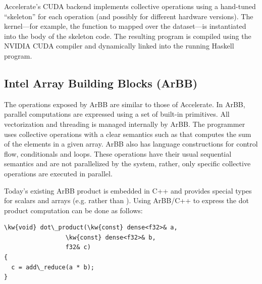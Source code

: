 
Accelerate's CUDA backend implements collective operations using
a hand-tuned ``skeleton'' for each operation (and possibly for
different hardware versions). The kernel---for example, the function
to mapped over the dataset---is 
instantiated into the body of the skeleton code. The resulting 
program is compiled using the NVIDIA CUDA compiler and dynamically linked 
into the running Haskell program.

\subsection{Intel Array Building Blocks (ArBB)}
\label{sec:arbb}

The operations exposed by ArBB are similar to those of Accelerate. 
In ArBB, parallel computations are expressed using a set of built-in 
primitives. All vectorization and threading is managed internally by 
ArBB. The programmer uses collective operations with a clear semantics 
such as  that computes the sum of the elements in a given 
array. ArBB also has language constructions for control flow, conditionals
and loops. These operations have their usual sequential semantics and are not 
parallelized by the system, rather, only specific collective operations are executed
in parallel. 

Today's existing ArBB product is embedded in C++ and provides special
types for scalars and arrays (e.g.  rather than ).
Using ArBB/C++ to express the dot product computation can be done 
as follows:

\begin{Verbatim}[commandchars=\\\{\}]
\kw{void} dot\_product(\kw{const} dense<f32>& a, 
                 \kw{const} dense<f32>& b,
                 f32& c) 
{ 
  c = add\_reduce(a * b);
}
\end{Verbatim} 


